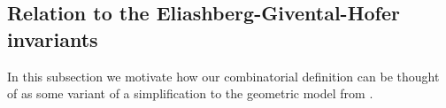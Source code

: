 \documentclass[11pt]{amsart}
\theoremstyle{mystyle}
\newcommand{\<}{\langle}
\renewcommand{\>}{\rangle}
\begin{document}

\subsection{Relation to the Eliashberg-Givental-Hofer invariants}
In this subsection we motivate how our combinatorial definition can be thought of as some variant of a simplification to the geometric model from \cite{egh2000SFT}.
\end{document}
